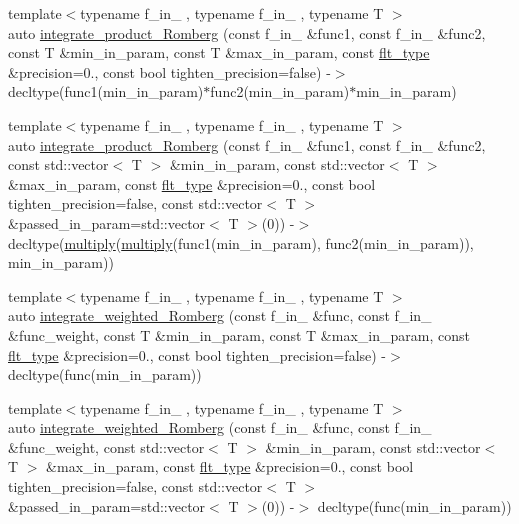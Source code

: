 \begin{DoxyCompactItemize}
{\footnotesize template$<$typename f\+\_\+in\+\_ , typename f\+\_\+in\+\_ , typename T $>$ }\\auto \hyperlink{namespaceIceBRG_a150af93dc262b9ff66f987a1c013cf31}{integrate\+\_\+product\+\_\+\+Romberg} (const f\+\_\+in\+\_ \&func1, const f\+\_\+in\+\_ \&func2, const T \&min\+\_\+in\+\_\+param, const T \&max\+\_\+in\+\_\+param, const \hyperlink{lib_2IceBRG__main_2common_8h_ad0f130a56eeb944d9ef2692ee881ecc4}{flt\+\_\+type} \&precision=0., const bool tighten\+\_\+precision=false) -\/$>$ decltype(func1(min\+\_\+in\+\_\+param)$\ast$func2(min\+\_\+in\+\_\+param)$\ast$min\+\_\+in\+\_\+param)
\item 
{\footnotesize template$<$typename f\+\_\+in\+\_ , typename f\+\_\+in\+\_ , typename T $>$ }\\auto \hyperlink{namespaceIceBRG_a48c26b090cff88c3222a60b8954c366b}{integrate\+\_\+product\+\_\+\+Romberg} (const f\+\_\+in\+\_ \&func1, const f\+\_\+in\+\_ \&func2, const std\+::vector$<$ T $>$ \&min\+\_\+in\+\_\+param, const std\+::vector$<$ T $>$ \&max\+\_\+in\+\_\+param, const \hyperlink{lib_2IceBRG__main_2common_8h_ad0f130a56eeb944d9ef2692ee881ecc4}{flt\+\_\+type} \&precision=0., const bool tighten\+\_\+precision=false, const std\+::vector$<$ T $>$ \&passed\+\_\+in\+\_\+param=std\+::vector$<$ T $>$(0)) -\/$>$ decltype(\hyperlink{namespaceIceBRG_ab535c998baac3ffc8412fdbae750b7d1}{multiply}(\hyperlink{namespaceIceBRG_ab535c998baac3ffc8412fdbae750b7d1}{multiply}(func1(min\+\_\+in\+\_\+param), func2(min\+\_\+in\+\_\+param)), min\+\_\+in\+\_\+param))
\item 
{\footnotesize template$<$typename f\+\_\+in\+\_ , typename f\+\_\+in\+\_ , typename T $>$ }\\auto \hyperlink{namespaceIceBRG_a22c144f87c68440bed33220e96d57978}{integrate\+\_\+weighted\+\_\+\+Romberg} (const f\+\_\+in\+\_ \&func, const f\+\_\+in\+\_ \&func\+\_\+weight, const T \&min\+\_\+in\+\_\+param, const T \&max\+\_\+in\+\_\+param, const \hyperlink{lib_2IceBRG__main_2common_8h_ad0f130a56eeb944d9ef2692ee881ecc4}{flt\+\_\+type} \&precision=0., const bool tighten\+\_\+precision=false) -\/$>$ decltype(func(min\+\_\+in\+\_\+param))
\item 
{\footnotesize template$<$typename f\+\_\+in\+\_ , typename f\+\_\+in\+\_ , typename T $>$ }\\auto \hyperlink{namespaceIceBRG_a0303a916ef72bb75fb83ef29be41ea72}{integrate\+\_\+weighted\+\_\+\+Romberg} (const f\+\_\+in\+\_ \&func, const f\+\_\+in\+\_ \&func\+\_\+weight, const std\+::vector$<$ T $>$ \&min\+\_\+in\+\_\+param, const std\+::vector$<$ T $>$ \&max\+\_\+in\+\_\+param, const \hyperlink{lib_2IceBRG__main_2common_8h_ad0f130a56eeb944d9ef2692ee881ecc4}{flt\+\_\+type} \&precision=0., const bool tighten\+\_\+precision=false, const std\+::vector$<$ T $>$ \&passed\+\_\+in\+\_\+param=std\+::vector$<$ T $>$(0)) -\/$>$ decltype(func(min\+\_\+in\+\_\+param))

\end{DoxyCompactItemize}
